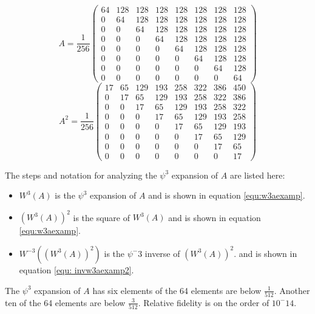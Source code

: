 \begin{equation}
\label{equ:basea}A= \frac{1}{256} \left(
\begin{array}{cccccccc}
64 & 128 & 128 & 128 & 128 & 128 & 128 & 128 \\ 
0 & 64 & 128 & 128 & 128 & 128 & 128 & 128 \\ 
0 & 0 & 64 & 128 & 128 & 128 & 128 & 128 \\ 
0 & 0 & 0 & 64 & 128 & 128 & 128 & 128 \\ 
0 & 0 & 0 & 0 & 64 & 128 & 128 & 128 \\ 
0 & 0 & 0 & 0 & 0 & 64 & 128 & 128 \\ 
0 & 0 & 0 & 0 & 0 & 0 & 64 & 128 \\ 
0 & 0 & 0 & 0 & 0 & 0 & 0 & 64
\end{array}\right)
\end{equation}
\begin{equation}
\label{equ:basea2}
A^2
=\allowbreak \frac{1}{256}\left(
\begin{array}{cccccccc}
17 & 65 & 129 & 193 & 258 & 322 & 386 & 450\\
0 & 17 & 65 & 129 & 193 & 258 & 322 & 386\\
0 & 0 & 17 & 65 & 129 & 193 & 258 & 322\\ 
0 & 0 & 0 & 17 & 65 & 129 & 193 & 258\\ 
0 & 0 & 0 & 0 & 17 & 65 & 129 & 193\\
0 & 0 & 0 & 0 & 0 & 17 & 65 & 129\\
0 & 0 & 0 & 0 & 0 & 0 & 17 & 65\\
0 & 0 & 0 & 0 & 0 & 0 & 0 & 17 
\end{array} \right)
\end{equation}

The steps and notation for analyzing the $\psi^3$ expansion of $A$ are listed here:
\begin{itemize}
\item $W^3(A)$ is the $\psi^3$ expansion of $A$ and is shown in equation \ref{equ:w3aexamp}.
\item $(W^3(A))^2$ is the square of $W^3(A)$ and is shown in equation \ref{equ:w3aexamp}.
\item $W^{-3}((W^3(A))^2)$ is the $\psi^-3$ inverse of $(W^3(A))^2$. and is shown in equation \ref{equ: invw3aexamp2}.
\end{itemize}
The $\psi^3$ expansion of $A$ has six elements of the 64 elements are below $\frac{1}{512}$.  Another ten of the 64 elements are below $\frac{3}{512}$.    Relative fidelity is on the order of $10^-14$. 

